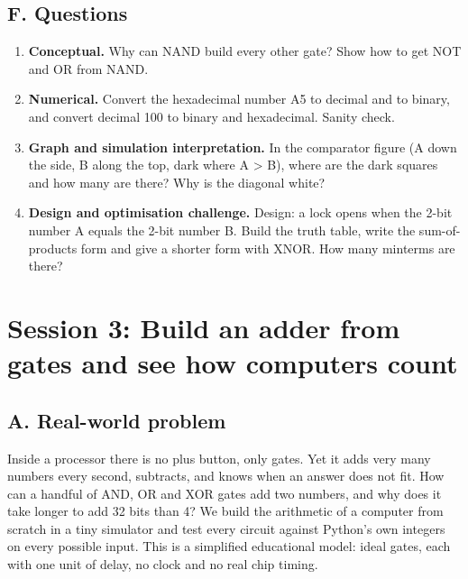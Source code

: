 \documentclass[11pt,a4paper]{article}
\begin{document}
\subsection*{F. Questions}
\begin{enumerate}[nosep]
\item \textbf{Conceptual.} Why can NAND build every other gate? Show how to get NOT and OR from NAND.
\item \textbf{Numerical.} Convert the hexadecimal number A5 to decimal and to binary, and convert decimal 100 to binary and hexadecimal. Sanity check.
\item \textbf{Graph and simulation interpretation.} In the comparator figure (A down the side, B along the top, dark where A \textgreater{} B), where are the dark squares and how many are there? Why is the diagonal white?
\item \textbf{Design and optimisation challenge.} Design: a lock opens when the 2-bit number A equals the 2-bit number B. Build the truth table, write the sum-of-products form and give a shorter form with XNOR. How many minterms are there?
\end{enumerate}

\section{Session 3: Build an adder from gates and see how computers count}

\subsection*{A. Real-world problem}
Inside a processor there is no plus button, only gates. Yet it adds very many numbers every second, subtracts, and knows when an answer does not fit. How can a handful of AND, OR and XOR gates add two numbers, and why does it take longer to add 32 bits than 4? We build the arithmetic of a computer from scratch in a tiny simulator and test every circuit against Python's own integers on every possible input. This is a simplified educational model: ideal gates, each with one unit of delay, no clock and no real chip timing.
\end{document}
